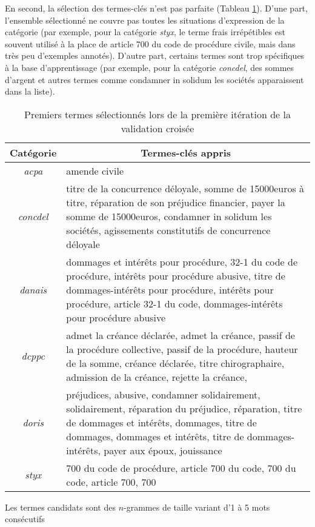 En second, la sélection des termes-clés n'est pas parfaite (Tableau \ref{tab:quanta:exemples_termes}). D'une part, l'ensemble sélectionné ne couvre pas toutes les situations d'expression de la catégorie (par exemple, pour la catégorie \textit{styx}, le terme \og frais irrépétibles\fg{} est souvent utilisé à la place de \og article 700 du code de procédure civile\fg{}, mais dans très peu d'exemples annotés). D'autre part, certains termes sont trop spécifiques à la base d'apprentissage (par exemple, pour la catégorie \textit{concdel}, des sommes d'argent et autres termes comme \og condamner in solidum les sociétés \fg{} apparaissent dans la liste).

\begin{table}[!htb]
		\centering\footnotesize
	\begin{tabular}{|c|p{}|}
		\hline
		{Catégorie} & \multicolumn{1}{c|}{Termes-clés appris} \\ \hline
		\textit{acpa} & amende civile  \\ \hline
		\textit{concdel} & titre de la concurrence déloyale, somme de 15000euros à titre, réparation de son préjudice financier, payer la somme de 15000euros, condamner in solidum les sociétés, agissements constitutifs de concurrence déloyale \\ \hline
		\textit{danais} & dommages et intérêts pour procédure, 32-1 du code de procédure, intérêts pour procédure abusive, titre de dommages-intérêts pour procédure, intérêts pour procédure, article 32-1 du code, dommages-intérêts pour procédure abusive \\ \hline
		\textit{dcppc} & admet la créance déclarée, admet la créance, passif de la procédure collective, passif de la procédure, hauteur de la somme, créance déclarée, titre chirographaire, admission de la créance, rejette la créance, \\ \hline
		\textit{doris} & préjudices, abusive, condamner solidairement, solidairement, réparation du préjudice, réparation, titre de dommages et intérêts, dommages, titre de dommages, dommages et intérêts, titre de dommages-intérêts, payer aux époux, jouissance \\ \hline
		\textit{styx} & 700 du code de procédure, article 700 du code, 700 du code, article 700, 700  \\ \hline
	\end{tabular}

Les termes candidats sont des $n$-grammes de taille variant d'1 à 5 mots consécutifs
\caption{Premiers termes sélectionnés lors de la première itération de la validation croisée} \label{tab:quanta:exemples_termes}
\end{table}

